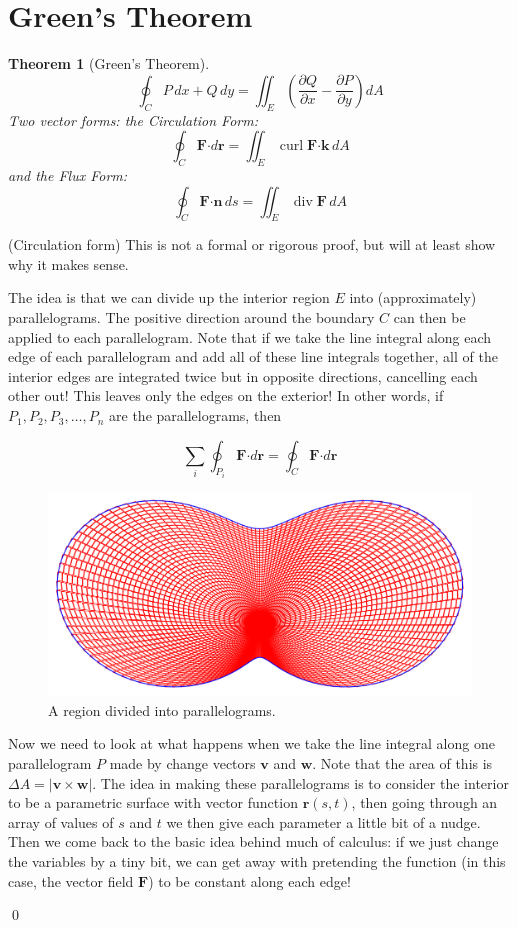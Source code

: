 \documentclass[letterpaper, 11pt, openany]{book}
\newcommand{\scdot}{\boldsymbol{\cdot}}
\newcommand{\pd}[2]{\frac{\partial #1}{\partial #2}}
\newcommand{\curl}[1]{\operatorname{curl}\mathbf{#1}}
\newcommand{\divr}[1]{\operatorname{div}\mathbf{#1}}
\theoremstyle{mytheoremstyle}
\newtheorem{theorem}{Theorem}[section]
\renewenvironment{proof}{{\par \sffamily \smaller \fontseries{b}\selectfont Proof}}{\hfill\qed}
\theoremstyle{myexamplestyle}
\begin{document}
\section{Green's Theorem}
\setcounter{figure}{0}

\begin{theorem}[Green's Theorem]
    \[\oint_{C} P \,dx + Q \, dy = \iint_{E} \left(\pd{Q}{x} - \pd{P}{y} \right) dA \]
    Two vector forms: the Circulation Form:
    \[\oint_{C} \mathbf{F} \scdot d\mathbf{r} = \iint_{E} \curl{F} \scdot \mathbf{k} \, dA\]
    and the Flux Form:
    \[\oint_{C} \mathbf{F} \scdot \mathbf{n} \, ds = \iint_{E} \divr{F} \, dA\]
\end{theorem}
\begin{proof}
    (Circulation form) This is not a formal or rigorous proof, but will at least show why it makes sense.

    The idea is that we can divide up the interior region \(E\) into (approximately) parallelograms. The positive direction around the boundary \(C\) can then be applied to each parallelogram. Note that if we take the line integral along each edge of each parallelogram and add all of these line integrals together, all of the interior edges are integrated twice but in opposite directions, cancelling each other out! This leaves only the edges on the exterior! In other words, if \(P_{1}, P_{2},P_{3},\ldots, P_{n}\) are the parallelograms, then

    \[\sum_{i} \oint_{P_{i}} \mathbf{F} \scdot d\mathbf{r} = \oint_{C} \mathbf{F} \scdot d\mathbf{r}\]

    \begin{figure}[htbp]
        \centering
            \includegraphics[width=0.9\linewidth]{Figures/greensparallelograms.pdf}
        \caption{A region divided into parallelograms.}
        \label{f:greens-region}
    \end{figure}

    Now we need to look at what happens when we take the line integral along one parallelogram \(P\) made by change vectors \(\mathbf{v}\) and \(\mathbf{w}\). Note that the area of this is \(\Delta A = |\mathbf{v} \times \mathbf{w}|\). The idea in making these parallelograms is to consider the interior to be a parametric surface with vector function \(\mathbf{r}(s,t)\), then going through an array of values of \(s\) and \(t\) we then give each parameter a little bit of a nudge. Then we come back to the basic idea behind much of calculus: if we just change the variables by a tiny bit, we can get away with pretending the function (in this case, the vector field \(\mathbf{F}\)) to be constant along each edge!


\end{proof}
\end{document}
